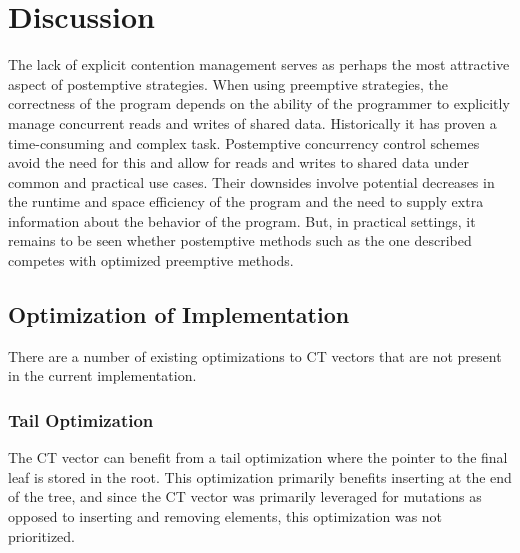 \documentclass[pageno]{jpaper}
\begin{document}
\section{Discussion}

The lack of explicit contention management serves as perhaps the most attractive
aspect of postemptive strategies. When using preemptive strategies, the
correctness of the program depends on the ability of the programmer to
explicitly manage concurrent reads and writes of shared data. Historically it
has proven a time-consuming and complex task. Postemptive concurrency control
schemes avoid the need for this and allow for reads and writes to shared data
under common and practical use cases. Their downsides involve potential
decreases in the runtime and space efficiency of the program and the need to
supply extra information about the behavior of the program. But, in practical
settings, it remains to be seen whether postemptive methods such as the one
described competes with optimized preemptive methods.

\subsection{Optimization of Implementation}
There are a number of existing optimizations to CT vectors that are not present
in the current implementation.

\subsubsection{Tail Optimization}
The CT vector can benefit from a tail optimization where the pointer to
the final leaf is stored in the root. This optimization primarily benefits
inserting at the end of the tree, and since the CT vector was primarily
leveraged for mutations as opposed to inserting and removing elements, this
optimization was not prioritized.
\end{document}
